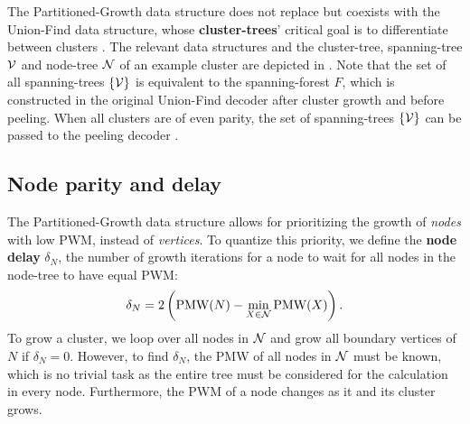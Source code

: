 The Partitioned-Growth data structure does not replace but coexists with the Union-Find data structure, whose \textbf{cluster-trees}' critical goal is to differentiate between clusters \cite{delfosse2017almost}. The relevant data structures and the cluster-tree, spanning-tree $\mathcal{V}$ and node-tree $\mathcal{N}$ of an example cluster are depicted in . Note that the set of all spanning-trees $\{\mathcal{V}\}$ is equivalent to the spanning-forest $F$, which is constructed in the original Union-Find decoder after cluster growth and before peeling. When all clusters are of even parity, the set of spanning-trees $\{\mathcal{V}\}$ can be passed to the peeling decoder \cite{delfosse2017linear}. 


\subsection{Node parity and delay}\label{sec:paritydelay}

The Partitioned-Growth data structure allows for prioritizing the growth of \emph{nodes} with low PWM, instead of \emph{vertices}. To quantize this priority, we define the \textbf{node delay} $\delta_N$, the number of growth iterations for a node to wait for all nodes in the node-tree to have equal PWM: 
\begin{equation}\label{eq:delayequation}
    \delta_N = 2\left(\text{PMW}(N) - \min_{X\in\mathcal{N}}{\text{PMW}(X)}\right).
\end{equation}
To grow a cluster, we loop over all nodes in $\mathcal{N}$ and grow all boundary vertices of $N$ if $\delta_N=0$. However, to find $\delta_N$, the PMW of all nodes in $\mathcal{N}$ must be known, which is no trivial task as the entire tree must be considered for the calculation in every node. Furthermore, the PWM of a node changes as it and its cluster grows. 


